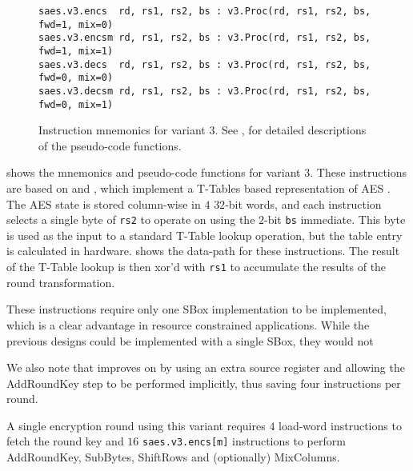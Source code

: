 
\begin{figure}
\begin{lstlisting}[language=pseudo,style=block]
saes.v3.encs  rd, rs1, rs2, bs : v3.Proc(rd, rs1, rs2, bs, fwd=1, mix=0)
saes.v3.encsm rd, rs1, rs2, bs : v3.Proc(rd, rs1, rs2, bs, fwd=1, mix=1)
saes.v3.decs  rd, rs1, rs2, bs : v3.Proc(rd, rs1, rs2, bs, fwd=0, mix=0)
saes.v3.decsm rd, rs1, rs2, bs : v3.Proc(rd, rs1, rs2, bs, fwd=0, mix=1)
\end{lstlisting}
\caption{
    Instruction mnemonics for variant 3.
    See ,  for detailed
    descriptions of the pseudo-code functions.
}
\label{fig:mnemonics:v3}
\end{figure}

 shows the mnemonics and pseudo-code functions
for variant 3.
These instructions are based on
\cite{NadIkeKur:04,BBFR:06} and \cite{Saarinen:20},
which implement a T-Tables based representation of AES \cite{DaeRij:02}.
The AES state is stored column-wise in $4$ $32$-bit words, and
each instruction selects a single byte of {\tt rs2} to operate on
using the $2$-bit {\tt bs} immediate.
This byte is used as the input to a standard T-Table lookup operation,
but the table entry is calculated in hardware.
 shows the data-path for these instructions.
The result of the T-Table lookup is then xor'd with {\tt rs1} to
accumulate the results of the round transformation.

These instructions require only one SBox implementation to be implemented,
which is a clear advantage in resource constrained applications.
While the previous designs could be implemented with a single SBox, they
would not

We also note that \cite{Saarinen:20} improves on \cite{BBFR:06}
by using an extra source register and allowing the AddRoundKey step to be
performed implicitly, thus saving four instructions per round.

A single encryption round using this variant requires
$4$ load-word instructions to fetch the round key and
$16$ {\tt saes.v3.encs[m]} instructions to perform AddRoundKey,
SubBytes, ShiftRows and (optionally) MixColumns.

